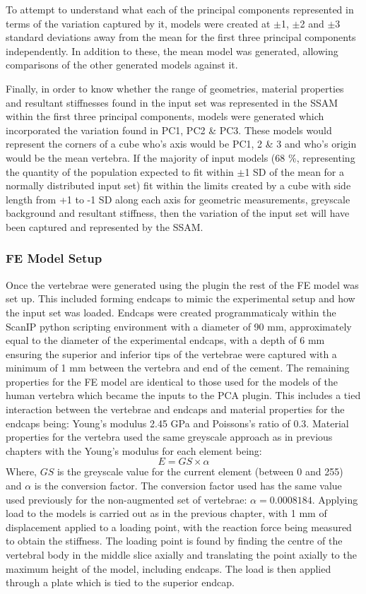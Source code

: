 To attempt to understand what each of the principal components represented in terms of the variation captured by it, models were created at $\pm$1, $\pm$2 and $\pm$3 standard deviations away from the mean for the first three principal components independently.
In addition to these, the mean model was generated, allowing comparisons of the other generated models against it.

Finally, in order to know whether the range of geometries, material properties and resultant stiffnesses found in the input set was represented in the SSAM within the first three principal components, models were generated which incorporated the variation found in PC1, PC2 \& PC3.
These models would represent the corners of a cube who's axis would be PC1, 2 \& 3 and who's origin would be the mean vertebra.
If the majority of input models (68 \%, representing the quantity of the population expected to fit within $\pm$1 SD of the mean for a normally distributed input set) fit within the limits created by a cube with side length from +1 to -1 SD along each axis for geometric measurements, greyscale background and resultant stiffness, then the variation of the input set will have been captured and represented by the SSAM.

\subsubsection{FE Model Setup}

Once the vertebrae were generated using the plugin the rest of the FE model was set up.
This included forming endcaps to mimic the experimental setup and how the input set was loaded.
Endcaps were created programmaticaly within the ScanIP python scripting environment with a diameter of 90 mm, approximately equal to the diameter of the experimental endcaps, with a depth of 6 mm ensuring the superior and inferior tips of the vertebrae were captured with a minimum of 1 mm between the vertebra and end of the cement.
The remaining properties for the FE model are identical to those used for the models of the human vertebra which became the inputs to the PCA plugin.
This includes a tied interaction between the vertebrae and endcaps and material properties for the endcaps being: Young's modulus 2.45 GPa and Poissons's ratio of 0.3.
Material properties for the vertebra used the same greyscale approach as in previous chapters with the Young's modulus for each element being:
\[ E = GS \times \alpha \]
Where, $GS$ is the greyscale value for the current element (between 0 and 255) and $\alpha$ is the conversion factor.
The conversion factor used has the same value used previously for the non-augmented set of vertebrae: $\alpha = 0.0008184$.
Applying load to the models is carried out as in the previous chapter, with 1 mm of displacement applied to a loading point, with the reaction force being measured to obtain the stiffness.
The loading point is found by finding the centre of the vertebral body in the middle slice axially and translating the point axially to the maximum height of the model, including endcaps.
The load is then applied through a plate which is tied to the superior endcap.

